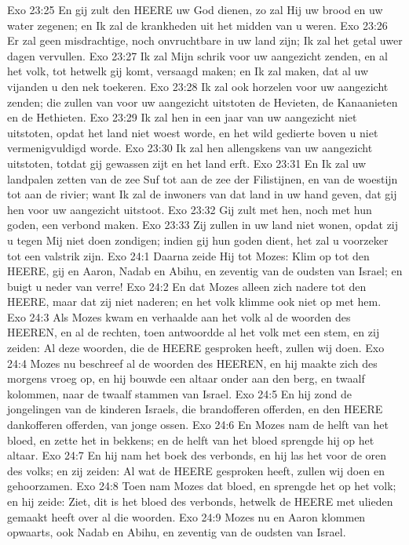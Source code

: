 Exo 23:25  En gij zult den HEERE uw God dienen, zo zal Hij uw brood en uw water zegenen; en Ik zal de krankheden uit het midden van u weren.
Exo 23:26  Er zal geen misdrachtige, noch onvruchtbare in uw land zijn; Ik zal het getal uwer dagen vervullen.
Exo 23:27  Ik zal Mijn schrik voor uw aangezicht zenden, en al het volk, tot hetwelk gij komt, versaagd maken; en Ik zal maken, dat al uw vijanden u den nek toekeren.
Exo 23:28  Ik zal ook horzelen voor uw aangezicht zenden; die zullen van voor uw aangezicht uitstoten de Hevieten, de Kanaanieten en de Hethieten.
Exo 23:29  Ik zal hen in een jaar van uw aangezicht niet uitstoten, opdat het land niet woest worde, en het wild gedierte boven u niet vermenigvuldigd worde.
Exo 23:30  Ik zal hen allengskens van uw aangezicht uitstoten, totdat gij gewassen zijt en het land erft.
Exo 23:31  En Ik zal uw landpalen zetten van de zee Suf tot aan de zee der Filistijnen, en van de woestijn tot aan de rivier; want Ik zal de inwoners van dat land in uw hand geven, dat gij hen voor uw aangezicht uitstoot.
Exo 23:32  Gij zult met hen, noch met hun goden, een verbond maken.
Exo 23:33  Zij zullen in uw land niet wonen, opdat zij u tegen Mij niet doen zondigen; indien gij hun goden dient, het zal u voorzeker tot een valstrik zijn.
Exo 24:1  Daarna zeide Hij tot Mozes: Klim op tot den HEERE, gij en Aaron, Nadab en Abihu, en zeventig van de oudsten van Israel; en buigt u neder van verre!
Exo 24:2  En dat Mozes alleen zich nadere tot den HEERE, maar dat zij niet naderen; en het volk klimme ook niet op met hem.
Exo 24:3  Als Mozes kwam en verhaalde aan het volk al de woorden des HEEREN, en al de rechten, toen antwoordde al het volk met een stem, en zij zeiden: Al deze woorden, die de HEERE gesproken heeft, zullen wij doen.
Exo 24:4  Mozes nu beschreef al de woorden des HEEREN, en hij maakte zich des morgens vroeg op, en hij bouwde een altaar onder aan den berg, en twaalf kolommen, naar de twaalf stammen van Israel.
Exo 24:5  En hij zond de jongelingen van de kinderen Israels, die brandofferen offerden, en den HEERE dankofferen offerden, van jonge ossen.
Exo 24:6  En Mozes nam de helft van het bloed, en zette het in bekkens; en de helft van het bloed sprengde hij op het altaar.
Exo 24:7  En hij nam het boek des verbonds, en hij las het voor de oren des volks; en zij zeiden: Al wat de HEERE gesproken heeft, zullen wij doen en gehoorzamen.
Exo 24:8  Toen nam Mozes dat bloed, en sprengde het op het volk; en hij zeide: Ziet, dit is het bloed des verbonds, hetwelk de HEERE met ulieden gemaakt heeft over al die woorden.
Exo 24:9  Mozes nu en Aaron klommen opwaarts, ook Nadab en Abihu, en zeventig van de oudsten van Israel.

